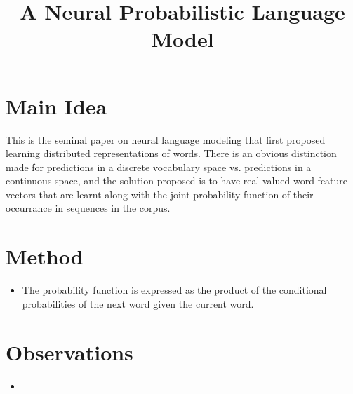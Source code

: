 \documentclass[12pt]{scrartcl}
\begin{document}
\title{A Neural Probabilistic Language Model}
\author{}
\date{}
\maketitle

\section{Main Idea}
  This is the seminal paper on neural language modeling that first proposed learning distributed representations of words. There is an obvious distinction made for predictions in a discrete vocabulary space vs. predictions in a continuous space, and the solution proposed is to have real-valued word feature vectors that are learnt along with the joint probability function of their occurrance in sequences in the corpus.

\section{Method}
  \begin{itemize}
    \item The probability function is expressed as the product of the conditional probabilities of the next word given the current word.
  \end{itemize}

\section{Observations}
  \begin{itemize}
    \item 
  \end{itemize}



\end{document}
